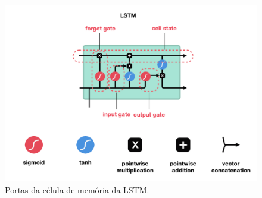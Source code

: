 \begin{figure}[h!]
  \centering
  \caption{Portas da célula de memória da LSTM.}
   \label{fig:cell_lstm_gates}
   \includegraphics[width=1\textwidth]{figuras/fig2_3_1.png}
\end{figure}
